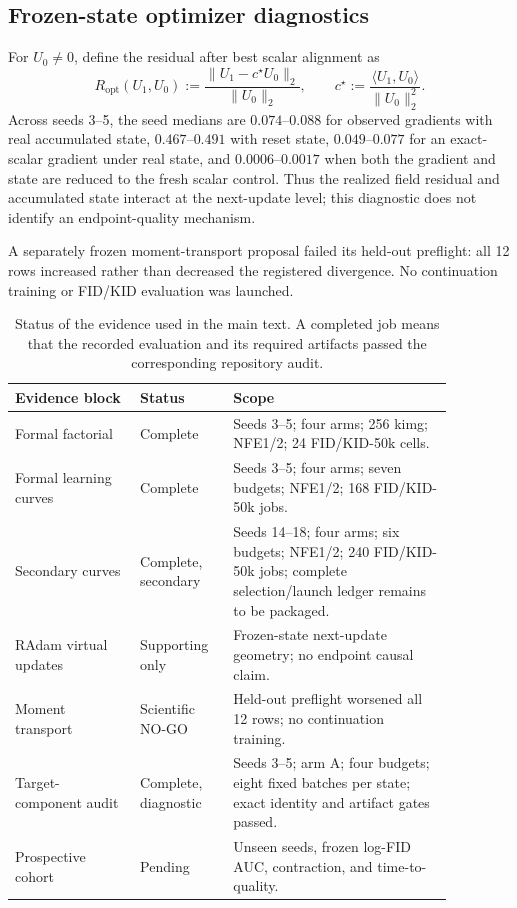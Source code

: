\documentclass{article}
\newcommand{\Ropt}{R_{\mathrm{opt}}}
\begin{document}
\subsection{Frozen-state optimizer diagnostics}

For $U_0\neq0$, define the residual after best scalar alignment as
\begin{equation}
  \Ropt(U_1,U_0)
  :=\frac{\lVert U_1-c^\star U_0\rVert_2}{\lVert U_0\rVert_2},
  \qquad
  c^\star:=\frac{\langle U_1,U_0\rangle}{\lVert U_0\rVert_2^2}.
  \label{eq:optimizer-residual}
\end{equation}
Across seeds 3--5, the seed medians are $0.074$--$0.088$ for observed
gradients with real accumulated state, $0.467$--$0.491$ with reset state,
$0.049$--$0.077$ for an exact-scalar gradient under real state, and
$0.0006$--$0.0017$ when both the gradient and state are reduced to the fresh
scalar control. Thus the realized field residual and accumulated state
interact at the next-update level; this diagnostic does not identify an
endpoint-quality mechanism.

A separately frozen moment-transport proposal failed its held-out preflight:
all 12 rows increased rather than decreased the registered divergence. No
continuation training or FID/KID evaluation was launched.

\begin{table}[h]
  \caption{Status of the evidence used in the main text. A completed job means
  that the recorded evaluation and its required artifacts passed the
  corresponding repository audit.}
  \label{tab:evidence-status}
  \centering
  \small
  \begin{tabular}{p{0.25\linewidth}p{0.18\linewidth}p{0.44\linewidth}}
    \toprule
    Evidence block & Status & Scope \\
    \midrule
    Formal factorial & Complete &
    Seeds 3--5; four arms; 256 kimg; NFE1/2; 24 FID/KID-50k cells. \\
    Formal learning curves & Complete &
    Seeds 3--5; four arms; seven budgets; NFE1/2; 168 FID/KID-50k jobs. \\
    Secondary curves & Complete, secondary &
    Seeds 14--18; four arms; six budgets; NFE1/2; 240 FID/KID-50k jobs;
    complete selection/launch ledger remains to be packaged. \\
    RAdam virtual updates & Supporting only &
    Frozen-state next-update geometry; no endpoint causal claim. \\
    Moment transport & Scientific NO-GO &
    Held-out preflight worsened all 12 rows; no continuation training. \\
    Target-component audit & Complete, diagnostic &
    Seeds 3--5; arm A; four budgets; eight fixed batches per state; exact
    identity and artifact gates passed. \\
    Prospective cohort & Pending &
    Unseen seeds, frozen log-FID AUC, contraction, and time-to-quality. \\
    \bottomrule
  \end{tabular}
\end{table}
\end{document}
